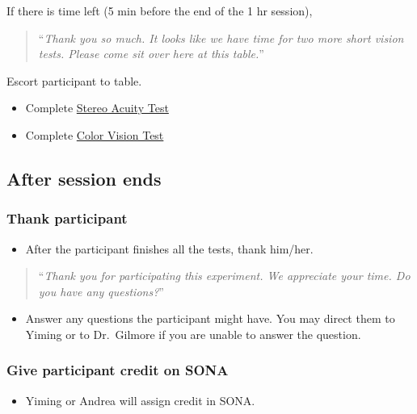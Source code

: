 \documentclass[]{article}
\providecommand{\tightlist}{%
  \setlength{\itemsep}{0pt}\setlength{\parskip}{0pt}}
\begin{document}
If there is time left (5 min before the end of the 1 hr session),

\begin{quote}
``\emph{Thank you so much. It looks like we have time for two more short
vision tests. Please come sit over here at this table.}''
\end{quote}

Escort participant to table.

\begin{itemize}
\tightlist
\item
  Complete \href{vision-screening-protocol.html}{Stereo Acuity Test}
\item
  Complete \href{vision-screening-protocol.html}{Color Vision Test}
\end{itemize}

\subsection{After session ends}\label{after-session-ends}

\subsubsection{Thank participant}\label{thank-participant}

\begin{itemize}
\tightlist
\item
  After the participant finishes all the tests, thank him/her.
\end{itemize}

\begin{quote}
``\emph{Thank you for participating this experiment. We appreciate your
time. Do you have any questions?}''
\end{quote}

\begin{itemize}
\tightlist
\item
  Answer any questions the participant might have. You may direct them
  to Yiming or to Dr.~Gilmore if you are unable to answer the question.
\end{itemize}

\subsubsection{Give participant credit on
SONA}\label{give-participant-credit-on-sona}

\begin{itemize}
\tightlist
\item
  Yiming or Andrea will assign credit in SONA.
\end{itemize}
\end{document}
